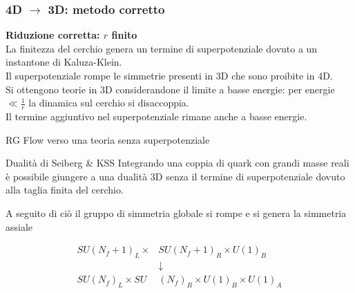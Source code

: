 \documentclass[10pt,compress]{beamer}
\begin{document}
\begin{frame}[fragile]
\frametitle{4D $\longrightarrow $ 3D: metodo corretto}
\begin{center}
{\Large \bfseries Riduzione corretta: $r$ finito}\\
\vspace{0.5cm}
La finitezza del cerchio genera un termine di superpotenziale dovuto a un instantone di Kaluza-Klein.\\
\vspace{0.3cm}
Il superpotenziale rompe le simmetrie presenti in 3D che sono proibite in 4D.\\
\vspace{0.3cm}
Si ottengono teorie in 3D considerandone il limite a basse energie:
per energie $\ll \frac{1}{r}$ la dinamica sul cerchio si disaccoppia. 
\\
\vspace{0.3cm}
Il termine aggiuntivo nel superpotenziale rimane anche a basse energie.
\end{center}
\end{frame}





\begin{frame}{RG Flow verso una teoria senza superpotenziale}
\begin{block}{Dualità di Seiberg \& KSS}
Integrando una coppia di quark con grandi masse reali è possibile giungere a una dualità 3D senza il termine di superpotenziale dovuto alla taglia finita del cerchio. 
\end{block}

\vspace{0.5cm}
A seguito di ciò il gruppo di simmetria globale si rompe e si genera la simmetria assiale

\begin{align*}
SU(N_f+1)_L \times &SU(N_f+1)_R \times U(1)_B \\
& \downarrow \\
 SU(N_f)_L \times SU& (N_f)_R \times U(1)_B \times U(1)_A
\end{align*}


\end{frame}
\end{document}
